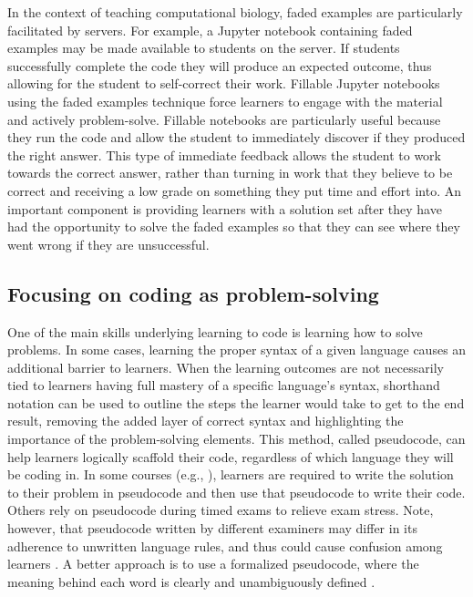 In the context of teaching computational biology, faded examples are particularly facilitated by servers.
For example, a Jupyter notebook containing faded examples may be made available to students on the server.
If students successfully complete the code they will produce an expected outcome, thus allowing for the student to self-correct their work.
Fillable Jupyter notebooks using the faded examples technique force learners to engage with the material and actively problem-solve. 
Fillable notebooks are particularly useful because they run the code and allow the student to immediately discover if they produced the right answer. 
This type of immediate feedback allows the student to work towards the correct answer, rather than turning in work that they believe to be correct and receiving a low grade on something they put time and effort into.
An important component is providing learners with a solution set after they have had the opportunity to solve the faded examples so that they can see where they went wrong if they are unsuccessful.

\subsection{Focusing on coding as problem-solving}
One of the main skills underlying learning to code is learning how to solve problems. 
In some cases, learning the proper syntax of a given language causes an additional barrier to learners.
When the learning outcomes are not necessarily tied to learners having full mastery of a specific language's syntax, shorthand notation can be used to outline the steps the learner would take to get to the end result, removing the added layer of correct syntax and highlighting the importance of the problem-solving elements.
This method, called pseudocode, can help learners logically scaffold their code, regardless of which language they will be coding in.
In some courses (e.g., \cite{olsen_using_2005}), learners are required to write the solution to their problem in pseudocode and then use that pseudocode to write their code.
Others rely on pseudocode during timed exams to relieve exam stress.
Note, however, that pseudocode written by different examiners may differ in its adherence to unwritten language rules, and thus could cause confusion among learners \cite{cutts_code_2014}. A better approach is to use a formalized pseudocode, where the meaning behind each word is clearly and unambiguously defined \cite{cutts_code_2014}.


